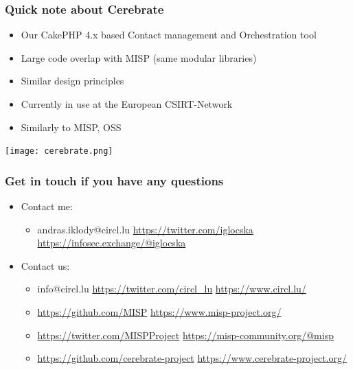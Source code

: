 \begin{frame}
\frametitle{Quick note about Cerebrate}
    \begin{itemize}
        \item Our CakePHP 4.x based Contact management and Orchestration tool
        \item Large code overlap with MISP (same modular libraries)
        \item Similar design principles
        \item Currently in use at the European CSIRT-Network
        \item Similarly to MISP, OSS
    \end{itemize}
    \texttt{[image: cerebrate.png]}
\end{frame}


\begin{frame}
  \frametitle{Get in touch if you have any questions}
  \begin{itemize}
    \item Contact me:
    \begin{itemize}
      \item andras.iklody@circl.lu \url{https://twitter.com/iglocska} \url{https://infosec.exchange/@iglocska}
    \end{itemize}    
    \item Contact us:
    \begin{itemize}
      \item info@circl.lu \url{https://twitter.com/circl_lu} \url{https://www.circl.lu/}
      \item \url{https://github.com/MISP} \url{https://www.misp-project.org/}
      \item \url{https://twitter.com/MISPProject} \url{https://misp-community.org/@misp}
      \item \url{https://github.com/cerebrate-project} \url{https://www.cerebrate-project.org/}
    \end{itemize}
  \end{itemize}
\end{frame}

